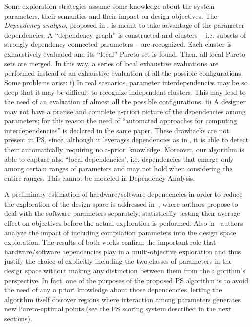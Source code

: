 Some exploration strategies assume some knowledge about the
system parameters, their semantics and their impact on design
objectives.  The \emph{Dependency analysis}, proposed in
\cite{givargis_tvlsi02}, is meant to take advantage of the parameter
dependencies. A ``dependency graph'' is constructed and clusters -- i.e. subsets of strongly dependency-connected parameters -- are recognized. Each cluster is exhaustively evaluated and its ``local''
Pareto set is found. Then, all local Pareto sets are merged. In this
way, a series of local exhaustive evaluations are performed instead of
an exhaustive evaluation of all the possible configurations. Some
problems arise: i) In real scenarios, parameter interdependencies may be so deep that it may be difficult to recognize independent clusters. This may lead to
the need of an evaluation of almost all the possible configurations.
ii) A designer may not have a precise and complete a-priori picture of
the dependencies among parameters; for this reason the need of
``automated approaches for computing interdependencies'' is declared
in the same paper.  These drawbacks are not present in PS,
since, although it leverages dependencies as in
\cite{givargis_tvlsi02}, it is able to detect them automatically, requiring no a-priori knowledge. Moreover, our algorithm is able to
capture also ``local dependencies", i.e. dependencies that emerge only
among certain ranges of parameters and may not hold when considering
the entire ranges. This cannot be modeled in Dependency Analysis. 

A preliminary estimation of hardware/software dependencies in order to
reduce the exploration of the design space is addressed in~\cite{Catania2008}, where
authors propose to deal with the software parameters separately,
statistically testing their average effect on objectives before the
actual exploration is performed. Also in~\cite{merging} authors
analyze the impact of including compilation parameters into the design
space exploration. The results of both works confirm the
important role that hardware/software dependencies play in a
multi-objective exploration and thus justify the choice of explicitly
including the two classes of parameters in the design space without
making any distinction between them from the algorithm's perspective.
In fact, one of the purposes of the proposed PS algorithm is to avoid
the need of any a priori knowledge about those dependencies, letting
the algorithm itself discover regions where interaction among
parameters generates new Pareto-optimal points (see the PS scoring
system described in the next sections).

